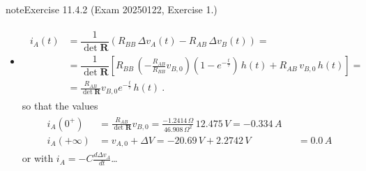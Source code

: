 \documentclass[letterpaper,10pt,english]{jupyterBook}
\begin{document}
\begin{sphinxadmonition}{note}{Exercise 11.4.2 (Exam 2025\sphinxhyphen{}01\sphinxhyphen{}22, Exercise 1.)}
\begin{itemize}
\sphinxAtStartPar
with \(\Delta v_{A,+\infty} = -\frac{R_{AB}}{R_{BB}} v_{B,0} = 2.2742 \, V\). The voltage across the capacitor as a function of time \(t\) thus reads
\begin{equation*}
\begin{split}\begin{aligned}
     v_A(t) 
     & = v_{A,0} + \Delta v_A(t) = \\
     & = v_{A,0} + \Delta v_{A,+\infty} \left( 1 - e^{-\frac{t}{\tau}} \right) \, h(t) \ ,
   \end{aligned}\end{split}
\end{equation*}
\sphinxAtStartPar
so that the values
\begin{equation*}
\begin{split}\begin{aligned} 
     v_A(0^+) & = v_{A,0}  && = -20.69 \, V \\
     v_A(+\infty) & = v_{A,0} + \Delta V = -20.69 \, V + 2.2742 \, V && = -18.4158 \, V
   \end{aligned}\end{split}
\end{equation*}
\item {} 
\sphinxAtStartPar
{}
\begin{equation*}
\begin{split}\begin{aligned}
      i_A(t)
      & = \dfrac{1}{\det \mathbf{R}} \left( R_{BB} \, \Delta v_A(t) - R_{AB} \, \Delta v_B(t) \right) = \\
      & = \dfrac{1}{\det \mathbf{R}} \left[ R_{BB} \, \left( -\frac{R_{AB}}{R_{BB}} v_{B,0} \right) \left( 1 - e^{-\frac{t}{\tau}} \right) \, h(t)  + R_{AB} \, v_{B,0} \, h(t) \right] = \\
      & = \frac{R_{AB}}{\det \mathbf{R}} v_{B,0} e^{-\frac{t}{\tau}} \, h(t) \ .
   \end{aligned}\end{split}
\end{equation*}
\sphinxAtStartPar
so that the values
\begin{equation*}
\begin{split}\begin{aligned} 
     i_A(0^+) & = \frac{R_{AB}}{\det \mathbf{R}} v_{B,0} = \frac{-1.2414 \, \Omega}{46.908 \, \Omega^2} \, 12.475 \, V = -0.334 \, A \\
     i_A(+\infty) & = v_{A,0} + \Delta V = -20.69 \, V + 2.2742 \, V && = 0.0 \, A
   \end{aligned}\end{split}
\end{equation*}
\sphinxAtStartPar
or with \(i_A = - C \frac{d \Delta v_A}{dt}\)…


\end{itemize}
\end{sphinxadmonition}
\end{document}
